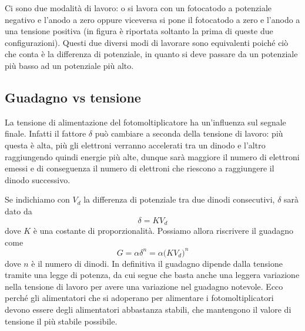 Ci sono due modalità di lavoro: o si lavora con un fotocatodo a potenziale negativo e l'anodo a zero oppure viceversa si pone il fotocatodo a zero e l'anodo a una tensione positiva (in figura è riportata soltanto la prima di queste due configurazioni). Questi due diversi modi di lavorare sono equivalenti poiché ciò che conta è la differenza di potenziale, in quanto si deve passare da un potenziale più basso ad un potenziale più alto.
\subsection{Guadagno vs tensione}
La tensione di alimentazione del fotomoltiplicatore ha un'influenza sul segnale finale. Infatti il fattore $\delta$ può cambiare a seconda della tensione di lavoro: più questa è alta, più gli elettroni verranno accelerati tra un dinodo e l'altro raggiungendo quindi energie più alte, dunque sarà maggiore il numero di elettroni emessi e di conseguenza il numero di elettroni che riescono a raggiungere il dinodo successivo.

Se indichiamo con $V_d$ la differenza di potenziale tra due dinodi consecutivi, $\delta$ sarà dato da
\begin{equation*}
   \delta=K V_d
\end{equation*}
dove $K$ è una costante di proporzionalità. Possiamo allora riscrivere il guadagno come
\begin{equation*}
   G=\alpha \delta^n
   =\alpha \bigl( KV_d \bigr)^n
\end{equation*}
dove $n$ è il numero di dinodi. In definitiva il guadagno dipende dalla tensione tramite una legge di potenza, da cui segue che basta anche una leggera variazione nella tensione di lavoro per avere una variazione nel guadagno notevole. Ecco perché gli alimentatori che si adoperano per alimentare i fotomoltiplicatori devono essere degli alimentatori abbastanza stabili, che mantengono il valore di tensione il più stabile possibile.

